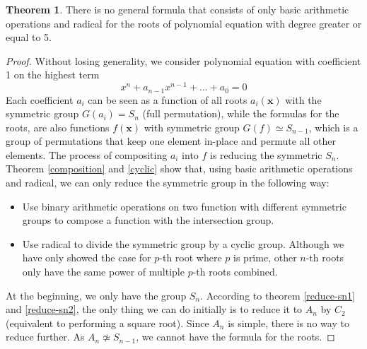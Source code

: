 \documentclass[]{article}
\newcommand{\vx}{\mathbf{x}}
\theoremstyle{definition}\newtheorem{theorem}{Theorem}
\begin{document}
\begin{theorem}
	There is no general formula that consists of only basic arithmetic operations and radical for the roots of polynomial equation with degree greater or equal to 5. 
\end{theorem}
\begin{proof}
	Without losing generality, we consider polynomial equation with coefficient 1 on the highest term
	\[
		x^n + a_{n-1}x^{n-1}+\dots+a_0 = 0
	\]
	Each coefficient $a_{i}$ can be seen as a function of all roots $a_{i}(\vx)$ with the symmetric group $G(a_i) = S_n$ (full permutation), while the formulas for the roots, are also functions $f(\vx)$ with symmetric group $G(f) \simeq S_{n-1}$, which is a group of permutations that keep one element in-place and permute all other elements. The process of compositing $a_{i}$ into $f$ is reducing the symmetric $S_n$. Theorem \ref{composition} and \ref{cyclic} show that, using basic arithmetic operations and radical, we can only reduce the symmetric group in the following way:
	\begin{itemize}
		\item Use binary arithmetic operations on two function with different symmetric groups to compose a function with the intersection group.
		\item Use radical to divide the symmetric group by a cyclic group. Although we have only showed the case for $p$-th root where $p$ is prime, other $n$-th roots only have the same power of multiple $p$-th roots combined.
	\end{itemize}
	At the beginning, we only have the group $S_n$.	According to theorem \ref{reduce-sn1} and \ref{reduce-sn2}, the only thing we can do initially is to reduce it to $A_n$ by $C_2$ (equivalent to performing a square root). Since $A_n$ is simple, there is no way to reduce further. As $A_n \not\simeq S_{n-1}$, we cannot have the formula for the roots.
	
\end{proof}
\end{document}
